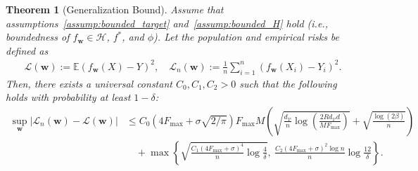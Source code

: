 \documentclass{article}
\theoremstyle{plain}
\newtheorem{theorem}{Theorem}[section]
\theoremstyle{definition}
\theoremstyle{remark}
\begin{document}
\begin{theorem}[Generalization Bound]
Assume that assumptions~\ref{assump:bounded_target} and~\ref{assump:bounded_H} hold (i.e., boundedness of $f_{\bm w} \in \mathcal{H}$, $f^*$, and $\phi$). Let the population and empirical risks be defined as
\begin{align*}
\mathcal{L}(\bm{w}) := \mathbb{E}(f_{\bm w}(X)-Y)^2, \quad
\mathcal{L}_n(\bm{w}) := \frac{1}{n} \sum_{i=1}^n (f_{\bm w}(X_i)-Y_i)^2.
\end{align*}
Then, there exists a universal constant \( C_0, C_1, C_2 > 0 \) such that the following holds with probability at least $1 - \delta$:
\begin{align}
\sup_{\bm{w}} \left| \mathcal{L}_n(\bm{w}) - \mathcal{L}(\bm{w}) \right|
&\leq C_0\left(4F_{\max} + \sigma\sqrt{2/\pi} \right) F_{\max} M 
\left(
\sqrt{\frac{d_{\mathcal{V}}}{n}\log \left(\frac{2Rd_{\mathcal{V}}d}{M F_{\max}} \right)} 
+ \sqrt{\frac{\log(2\beta)}{n}}
\right) \nonumber \\
&\quad + \max \left\{ 
\sqrt{\frac{C_1(4F_{\max}+\sigma)^4}{n} \log \frac{4}{\delta}},\ 
\frac{C_2(4F_{\max}+\sigma)^2 \log n}{n} \log \frac{12}{\delta}
\right\}.
\end{align}
\end{theorem}
\end{document}
